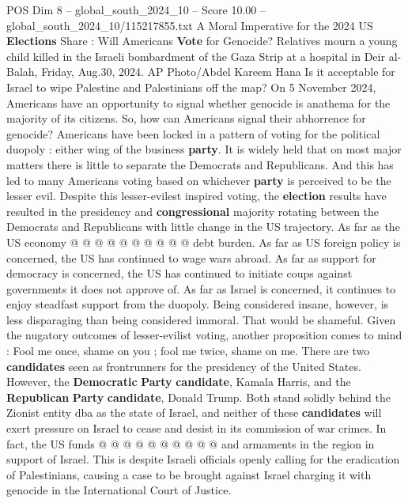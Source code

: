 \begin{textsample}{POS Dim 8 – global\_south\_2024\_10 – Score 10.00 – global\_south\_2024\_10/115217855.txt}  \label{ex:f8_pos_262}
A Moral Imperative for the 2024 US \textbf{Elections} Share : Will Americans \textbf{Vote} for Genocide?
Relatives mourn a young child killed in the Israeli bombardment of the Gaza Strip at a hospital in Deir al-Balah, Friday, Aug.30, 2024.
AP Photo/Abdel Kareem Hana Is it acceptable for Israel to wipe Palestine and Palestinians off the map?
On 5 November 2024, Americans have an opportunity to signal whether genocide is anathema for the majority of its citizens.
So, how can Americans signal their abhorrence for genocide?
Americans have been locked in a pattern of voting for the political duopoly : either wing of the business \textbf{party}.
It is widely held that on most major matters there is little to separate the Democrats and Republicans.
And this has led to many Americans voting based on whichever \textbf{party} is perceived to be the lesser evil.
Despite this lesser-evilest inspired voting, the \textbf{election} results have resulted in the presidency and \textbf{congressional} majority rotating between the Democrats and Republicans with little change in the US trajectory.
As far as the US economy @ @ @ @ @ @ @ @ @ @ debt burden.
As far as US foreign policy is concerned, the US has continued to wage wars abroad.
As far as support for democracy is concerned, the US has continued to initiate coups against governments it does not approve of.
As far as Israel is concerned, it continues to enjoy steadfast support from the duopoly.
Being considered insane, however, is less disparaging than being considered immoral.
That would be shameful.
Given the nugatory outcomes of lesser-evilist voting, another proposition comes to mind : Fool me once, shame on you ; fool me twice, shame on me.
There are two \textbf{candidates} seen as frontrunners for the presidency of the United States.
However, the \textbf{Democratic} \textbf{Party} \textbf{candidate}, Kamala Harris, and the \textbf{Republican} \textbf{Party} \textbf{candidate}, Donald Trump.
Both stand solidly behind the Zionist entity dba as the state of Israel, and neither of these \textbf{candidates} will exert pressure on Israel to cease and desist in its commission of war crimes.
In fact, the US funds @ @ @ @ @ @ @ @ @ @ and armaments in the region in support of Israel.
This is despite Israeli officials openly calling for the eradication of Palestinians, causing a case to be brought against Israel charging it with genocide in the International Court of Justice.

\end{textsample}
